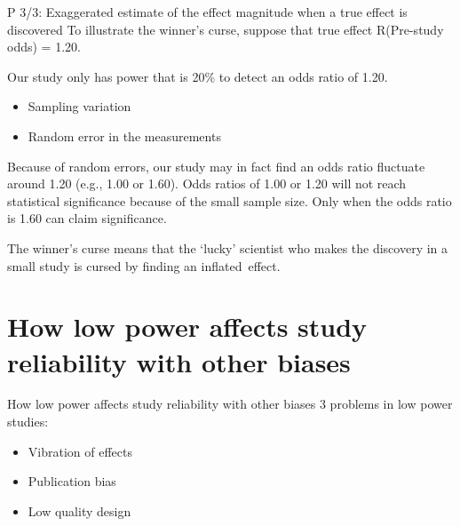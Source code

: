 \documentclass{beamer}
\begin{document}
	\begin{frame}{P 3/3: Exaggerated estimate of the effect magnitude when a true effect is discovered}
		To illustrate the winner’s curse, suppose that true effect R(Pre-study odds) =  1.20.
		
		\fontsize{10pt}{12pt}\selectfont
		Our study only has power that is 20\% to detect an odds ratio of 1.20.
		
		\fontsize{10pt}{12pt}\selectfont
		\begin{itemize}
			\item Sampling variation
			\item Random error in the measurements
		\end{itemize}
		
		\fontsize{10pt}{12pt}\selectfont
		Because of random errors, our study may in fact find an odds ratio fluctuate around 1.20 (e.g., 1.00 or 1.60). Odds ratios of 1.00 or 1.20 will not reach statistical significance because of the small sample size. Only when the odds ratio is 1.60 can claim significance. 
		
		\fontsize{10pt}{12pt}\selectfont
		The winner’s curse means that the ‘lucky’ scientist who makes the discovery in a small study is cursed by finding an inflated effect.
	\end{frame}
	
	\section{How low power affects study reliability \textbf{with other biases}}
	
	\begin{frame}{How low power affects study reliability with other biases}
		3 problems in low power studies:
		\begin{itemize}
			\item Vibration of effects
			\item Publication bias
			\item Low quality design
		\end{itemize}
	\end{frame}
	
\end{document}
